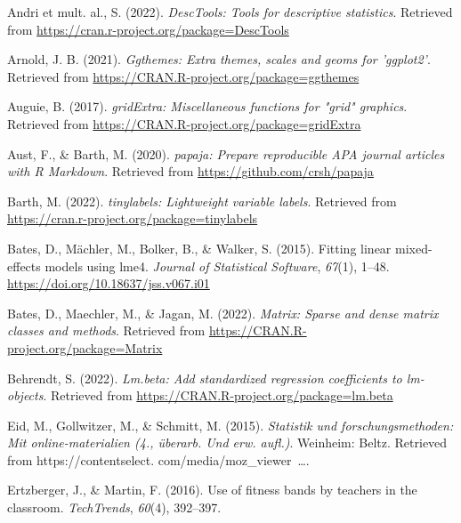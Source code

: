\documentclass[
  man]{apa6}
\newlength{\cslhangindent}
\newlength{\cslentryspacingunit} %
\newenvironment{CSLReferences}[2] %
 {%
  \setlength{\parindent}{0pt}
  \ifodd #1
  \let\oldpar\par
  \def\par{\hangindent=\cslhangindent\oldpar}
  \fi
  \setlength{\parskip}{#2\cslentryspacingunit}
 }%
 {}
\begin{document}
\hypertarget{refs}{}
\begin{CSLReferences}{1}{0}
\leavevmode{}%
Andri et mult. al., S. (2022). \emph{{DescTools}: Tools for descriptive statistics}. Retrieved from \url{https://cran.r-project.org/package=DescTools}

\leavevmode{}%
Arnold, J. B. (2021). \emph{Ggthemes: Extra themes, scales and geoms for 'ggplot2'}. Retrieved from \url{https://CRAN.R-project.org/package=ggthemes}

\leavevmode{}%
Auguie, B. (2017). \emph{gridExtra: Miscellaneous functions for "grid" graphics}. Retrieved from \url{https://CRAN.R-project.org/package=gridExtra}

\leavevmode{}%
Aust, F., \& Barth, M. (2020). \emph{{papaja}: {Prepare} reproducible {APA} journal articles with {R Markdown}}. Retrieved from \url{https://github.com/crsh/papaja}

\leavevmode{}%
Barth, M. (2022). \emph{{tinylabels}: Lightweight variable labels}. Retrieved from \url{https://cran.r-project.org/package=tinylabels}

\leavevmode{}%
Bates, D., Mächler, M., Bolker, B., \& Walker, S. (2015). Fitting linear mixed-effects models using {lme4}. \emph{Journal of Statistical Software}, \emph{67}(1), 1--48. \url{https://doi.org/10.18637/jss.v067.i01}

\leavevmode{}%
Bates, D., Maechler, M., \& Jagan, M. (2022). \emph{Matrix: Sparse and dense matrix classes and methods}. Retrieved from \url{https://CRAN.R-project.org/package=Matrix}

\leavevmode{}%
Behrendt, S. (2022). \emph{Lm.beta: Add standardized regression coefficients to lm-objects}. Retrieved from \url{https://CRAN.R-project.org/package=lm.beta}

\leavevmode{}%
Eid, M., Gollwitzer, M., \& Schmitt, M. (2015). \emph{Statistik und forschungsmethoden: Mit online-materialien (4., {ü}berarb. Und erw. aufl.)}. Weinheim: Beltz. Retrieved from https://contentselect. com/media/moz\_viewer~\ldots.

\leavevmode{}%
Ertzberger, J., \& Martin, F. (2016). Use of fitness bands by teachers in the classroom. \emph{TechTrends}, \emph{60}(4), 392--397.


\end{CSLReferences}
\end{document}
